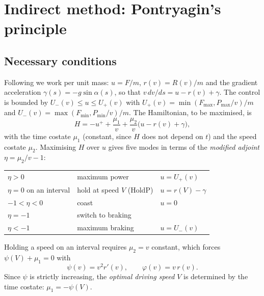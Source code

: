 \documentclass[11pt,a4paper]{article}
\begin{document}
\section{Indirect method: Pontryagin's principle}\label{sec:indirect}

\subsection{Necessary conditions}

Following \citet{Albrecht2016a} we work per unit mass: $u = F/m$, $r(v) = R(v)/m$ and the gradient acceleration
$\gamma(s) = -g\sin\alpha(s)$, so that $v\,dv/ds = u - r(v) + \gamma$. The control is bounded by
$U_-(v) \le u \le U_+(v)$ with $U_+(v) = \min(F_{\max}, P_{\max}/v)/m$ and $U_-(v) = \max(F_{\min}, P_{\min}/v)/m$.
The Hamiltonian, to be maximised, is
\begin{equation}
  H = -u^+ + \frac{\mu_1}{v} + \frac{\mu_2}{v}\big(u - r(v) + \gamma\big),
\end{equation}
with the time costate $\mu_1$ (constant, since $H$ does not depend on $t$) and the speed costate $\mu_2$. Maximising
$H$ over $u$ gives five modes in terms of the \emph{modified adjoint} $\eta = \mu_2/v - 1$:
\begin{center}
\begin{tabular}{lll}
\toprule
$\eta > 0$ & maximum power & $u = U_+(v)$ \\
$\eta = 0$ on an interval & hold at speed $V$ (HoldP) & $u = r(V) - \gamma$ \\
$-1 < \eta < 0$ & coast & $u = 0$ \\
$\eta = -1$ & switch to braking & \\
$\eta < -1$ & maximum braking & $u = U_-(v)$ \\
\bottomrule
\end{tabular}
\end{center}
Holding a speed on an interval requires $\mu_2 = v$ constant, which forces $\psi(V) + \mu_1 = 0$ with
\begin{equation}
  \psi(v) = v^2 r'(v), \qquad \varphi(v) = v\, r(v).
\end{equation}
Since $\psi$ is strictly increasing, the \emph{optimal driving speed} $V$ is determined by the time costate:
$\mu_1 = -\psi(V)$.
\end{document}
